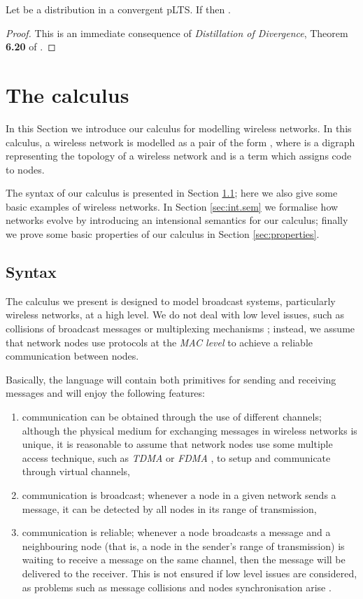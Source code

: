 \documentclass{LMCS}
\begin{document}
\begin{prop}
\label{prop:convergent.moves}
Let  be a distribution in a convergent pLTS. 
If  then . 
\end{prop}
\begin{proof}
This is an immediate consequence of \emph{Distillation of 
Divergence}, Theorem \textbf{6.20} of \cite{DGHM09full}.
\end{proof}

\section{The calculus}
\label{sec:lang}
In this Section we introduce our calculus for modelling wireless networks. 
In this calculus, a wireless network is modelled as a pair of the form 
, where  is a digraph representing the 
topology of a wireless network and  is a term which assigns code to 
nodes. 

The syntax of our calculus is presented in Section \ref{sec:syntax}; 
here we also give some basic examples of wireless networks. 
In Section \ref{sec:int.sem} we formalise how networks evolve by 
introducing an intensional semantics for our calculus; 
finally we prove some basic properties of our calculus in 
Section \ref{sec:properties}.

\subsection{Syntax}
\label{sec:syntax}
The calculus we present is designed to model broadcast systems, particularly wireless 
networks, at a high level. We do not deal with low level issues, such as collisions of 
broadcast messages or multiplexing mechanisms \cite{tanenbaum}; instead, 
we assume that network nodes use protocols  at the \emph{MAC level} \cite{macsurvey} 
to achieve a reliable communication 
between nodes.

Basically, the language will contain both primitives for sending and receiving messages and 
will enjoy the following features:
\begin{enumerate}[label=(\roman*)]
\item communication can be obtained through the use of different channels; although the physical medium 
for exchanging messages in wireless networks is unique, it is reasonable to assume that network nodes use 
some multiple access technique, such as \emph{TDMA} or \emph{FDMA} \cite{tanenbaum}, to setup and 
communicate through virtual channels,
\item communication is broadcast; whenever a node in a given network sends a message, it can be detected by 
all nodes in its range of transmission,
\item communication is reliable; whenever a node broadcasts 
a message and a neighbouring node (that is, 
a node in the sender's range of transmission) is waiting 
to receive a message on the same channel, then the 
message will be delivered to the receiver. This is not 
ensured if low level issues are considered, 
as problems such as message collisions \cite{macsurvey}
and nodes synchronisation \cite{time} arise .
\end{enumerate}
\end{document}
